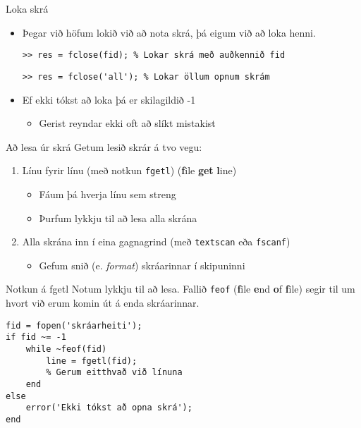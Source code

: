 \documentclass{beamer}
\begin{document}
\begin{frame}[fragile]{Loka skrá}
\begin{itemize}
 \item Þegar við höfum lokið við að nota skrá, þá eigum við að loka henni.
\begin{verbatim}
>> res = fclose(fid); % Lokar skrá með auðkennið fid
\end{verbatim}
\begin{verbatim}
>> res = fclose('all'); % Lokar öllum opnum skrám
\end{verbatim}
 \item Ef ekki tókst að loka þá er skilagildið -1
 \begin{itemize}
  \item Gerist reyndar ekki oft að slíkt mistakist
 \end{itemize}
\end{itemize}
\end{frame}

\begin{frame}{Að lesa úr skrá}
Getum lesið skrár á tvo vegu:
\begin{enumerate}
 \item Línu fyrir línu (með notkun \texttt{fgetl}) (\textbf{f}ile \textbf{get} \textbf{l}ine)
 \begin{itemize}
  \item Fáum þá hverja línu sem streng
  \item Þurfum lykkju til að lesa alla skrána
 \end{itemize}
 \item Alla skrána inn í eina gagnagrind (með \texttt{textscan} eða \texttt{fscanf})
 \begin{itemize}
  \item Gefum snið (e. \emph{format}) skráarinnar í skipuninni
 \end{itemize}
\end{enumerate}
\end{frame}


\begin{frame}[fragile]{Notkun á fgetl}
\vspace{\baselineskip}
Notum lykkju til að lesa. Fallið \texttt{feof} (\textbf{f}ile \textbf{e}nd \textbf{o}f \textbf{f}ile) segir til um hvort við erum komin út á enda skráarinnar.
\begin{verbatim}
fid = fopen('skráarheiti');
if fid ~= -1
    while ~feof(fid)
        line = fgetl(fid);
        % Gerum eitthvað við línuna
    end
else
    error('Ekki tókst að opna skrá');
end
\end{verbatim}
\end{frame}
\end{document}
